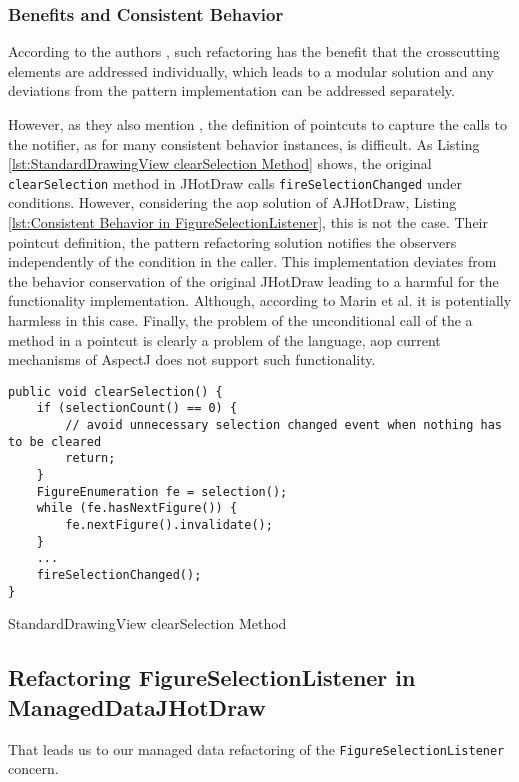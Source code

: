 \subsubsection{Benefits and Consistent Behavior}
According to the authors \cite{marin2005approach}, such refactoring has the benefit that the crosscutting elements are addressed individually, which leads to a modular solution and any deviations from the pattern implementation can be addressed separately.

However, as they also mention \cite{marin2005approach}, the definition of pointcuts to capture the calls to the notifier, as for many consistent behavior instances, is difficult. 
As Listing \ref{lst:StandardDrawingView clearSelection Method} shows, the original \texttt{clearSelection} method in JHotDraw calls \texttt{fireSelectionChanged} under conditions.
However, considering the \ac{aop} solution of AJHotDraw, Listing \ref{lst:Consistent Behavior in FigureSelectionListener}, this is not the case.
Their pointcut definition, the pattern refactoring solution notifies the observers independently of the condition in the caller.
This implementation deviates from the behavior conservation of the original JHotDraw leading to a harmful for the functionality implementation.
Although, according to Marin et al. it is potentially harmless in this case.
Finally, the problem of the unconditional call of the a method in a pointcut is clearly a problem of the language, \ac{aop} current mechanisms of AspectJ does not support such functionality.

\begin{sourcecode}
	\begin{lstlisting}[language=AspectJ, escapechar=|]
public void clearSelection() {
	if (selectionCount() == 0) {
		// avoid unnecessary selection changed event when nothing has to be cleared
		return;
	}
	FigureEnumeration fe = selection();
	while (fe.hasNextFigure()) {
		fe.nextFigure().invalidate();
	}
	...
	fireSelectionChanged();
}
	\end{lstlisting}
	\caption{StandardDrawingView clearSelection Method}
	\label{lst:StandardDrawingView clearSelection Method}
\end{sourcecode}

\subsection{Refactoring FigureSelectionListener in ManagedDataJHotDraw}
That leads us to our managed data refactoring of the \texttt{FigureSelectionListener} concern.

